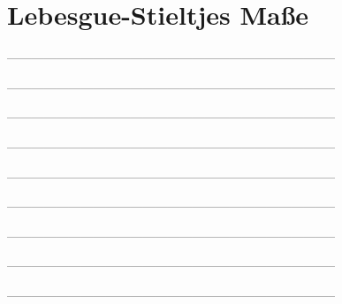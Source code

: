 \setcounter{exercise}{0}

\section{Lebesgue-Stieltjes Maße}

--------------------------------------------------------------------------------



--------------------------------------------------------------------------------



--------------------------------------------------------------------------------



--------------------------------------------------------------------------------



--------------------------------------------------------------------------------



--------------------------------------------------------------------------------



--------------------------------------------------------------------------------



--------------------------------------------------------------------------------



--------------------------------------------------------------------------------
